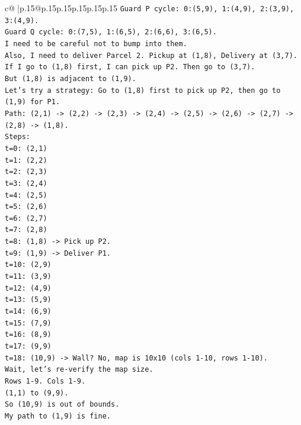 \documentclass{article}
\begin{document}
{\begin{supertabular}{c@{$\;$}|p{.15\linewidth}@{}p{.15\linewidth}p{.15\linewidth}p{.15\linewidth}p{.15\linewidth}p{.15\linewidth}}
{{{\texttt{Guard P cycle: 0:(5,9), 1:(4,9), 2:(3,9), 3:(4,9).} \\
\texttt{Guard Q cycle: 0:(7,5), 1:(6,5), 2:(6,6), 3:(6,5).} \\
\texttt{I need to be careful not to bump into them.} \\
\texttt{Also, I need to deliver Parcel 2. Pickup at (1,8), Delivery at (3,7).} \\
\texttt{If I go to (1,8) first, I can pick up P2. Then go to (3,7).} \\
\texttt{But (1,8) is adjacent to (1,9).} \\
\texttt{Let's try a strategy: Go to (1,8) first to pick up P2, then go to (1,9) for P1.} \\
\texttt{Path: (2,1) {-}> (2,2) {-}> (2,3) {-}> (2,4) {-}> (2,5) {-}> (2,6) {-}> (2,7) {-}> (2,8) {-}> (1,8).} \\
\texttt{Steps:} \\
\texttt{t=0: (2,1)} \\
\texttt{t=1: (2,2)} \\
\texttt{t=2: (2,3)} \\
\texttt{t=3: (2,4)} \\
\texttt{t=4: (2,5)} \\
\texttt{t=5: (2,6)} \\
\texttt{t=6: (2,7)} \\
\texttt{t=7: (2,8)} \\
\texttt{t=8: (1,8) {-}> Pick up P2.} \\
\texttt{t=9: (1,9) {-}> Deliver P1.} \\
\texttt{t=10: (2,9)} \\
\texttt{t=11: (3,9)} \\
\texttt{t=12: (4,9)} \\
\texttt{t=13: (5,9)} \\
\texttt{t=14: (6,9)} \\
\texttt{t=15: (7,9)} \\
\texttt{t=16: (8,9)} \\
\texttt{t=17: (9,9)} \\
\texttt{t=18: (10,9) {-}> Wall? No, map is 10x10 (cols 1{-}10, rows 1{-}10).} \\
\texttt{Wait, let's re{-}verify the map size.} \\
\texttt{Rows 1{-}9. Cols 1{-}9.} \\
\texttt{(1,1) to (9,9).} \\
\texttt{So (10,9) is out of bounds.} \\
\texttt{My path to (1,9) is fine.} \\
}}}
\end{supertabular}}
\end{document}
